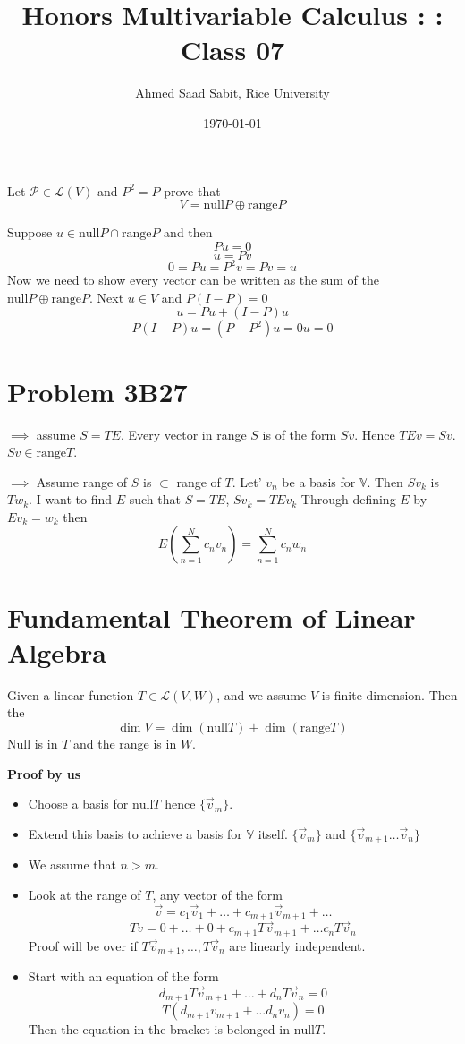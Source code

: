 \documentclass[letter]{article}
\title{Honors Multivariable Calculus : : Class 07}
\author{Ahmed Saad Sabit, Rice University}
\date{\today}
\begin{document}
	\maketitle 

	Let $\mathcal P \in  \mathcal L(V)$ and $P^2 = P$ prove that 
	 \[
	V = \text{null} P \oplus \text{range} P
	\] 

Suppose $u \in \text{null}P \cap \text{range} P$ and then 
\[
P u = 0
\] 
\[
u = Pv
\] 
\[
0 = Pu = P^2 v = Pv = u
\] 
Now we need to show every vector can be written as the sum of the $\text{null} P \oplus \text{range}P$. 
Next $u \in  V$ and $P(I - P  ) = 0$ 
\[
 u = P u + (I - P)u 
\] 
\[
P(I-P) u = (P - P^2)u = 0 u = 0 
\]

\section{Problem 3B27} 
$\implies$ assume $S = TE$. Every vector in range $S$ is of the form $Sv$. Hence $TEv = Sv$. $Sv \in \text{range}T$. 

$\implies$ Assume range of $S$ is $\subset $ range of $T$. Let' $v_n$ be a basis for $\mathbb{V}$. Then 
$S v_k$ is $T w_k$. I want to find $E$ such that $S = TE$, $S v_k = TE v_k$ 
Through defining $E$ by $Ev_k = w_k$ then 
\[
E (\sum_{n=1}^{N} c_n v_n) = \sum_{n=1}^{N} c_n w_n
\]

\section{Fundamental Theorem of Linear Algebra}
Given a linear function $T \in \mathcal L (V, W)$, and we assume $V$ is finite dimension. Then the 
\[
\dim V = \dim \left(\text{null} T\right) + \dim \left(\text{range} T\right)
\]
Null is in $T$ and the range is in $W$.

\textbf{Proof by us}
\begin{itemize}
	\item Choose a basis for $\text{null}T$ hence $\{\vec{v}_m\} $.
	\item Extend this basis to achieve a basis for $\mathbb{V}$ itself. $\{\vec{v}_m\}  $ and $\{\vec{v}_{m+1} \ldots \vec{v}_n\} $ 
	\item We assume that $n>m$.
	\item Look at the range of $T$, any vector of the form
		\[
			\vec{v} = c_1 \vec{v}_1 + \ldots + c_{m+1} \vec{v}_{m+1} + \ldots
		\]
		\[
			Tv = 0 + \ldots + 0 + c_{m+1} T \vec{v}_{m+1} + \ldots c_n T \vec{v}_{n}
		\]
		Proof will be over if $T \vec{v}_{m+1} , \ldots, T \vec{v}_n $ are linearly independent.\item Start with an equation of the form 
		\[
			d_{m+1} T \vec{v}_{m+1} + \ldots + d_n T \vec{v}_n = 0
		\]
		\[
			T ( d_{m+1} v_{m+1} + \ldots d_n v_n ) = 0
		\] 
		Then the equation in the bracket is belonged in $\text{null}T$. 
\end{itemize}
\end{document}

